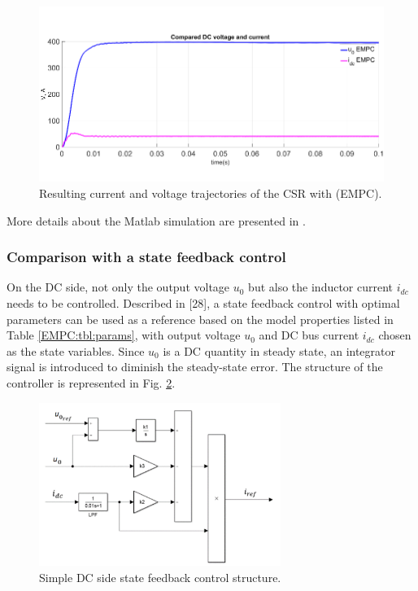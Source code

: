     \begin{figure}[!ht]
        \centering
        \includegraphics[width=\textwidth]{EMPC_PNG_Pics/Result_PerformanceEMPC.png}
        \caption{Resulting current and voltage trajectories of the CSR with (EMPC).}
        \label{EMPC:fig:Result_PerformanceEMPC}
    \end{figure}

    More details about the Matlab simulation are presented in \cite{neukirchner2019linkedmodel}.

    \subsubsection{Comparison with a state feedback control}\label{EMPC:sec:Comparison}

    On the DC side, not only the output voltage $u_0$ but also the inductor current $i_{dc}$ needs to be controlled. Described in [28], a state feedback control with optimal parameters can be used as a reference based on the model properties listed in Table \ref{EMPC:tbl:params}, with output voltage $u_0$ and DC bus current $i_{dc}$ chosen as the state variables. Since $u_0$ is a DC quantity in steady state, an integrator signal is introduced to diminish the steady-state error. The structure of the controller is represented in Fig. \ref{EMPC:fig:SFeedbackDC}.

    \begin{figure}[!ht]
        \centering
        \includegraphics[width=0.7\textwidth]{EMPC_PNG_Pics/SFeedbackDC.png}
        \caption{Simple DC side state feedback control structure.}
        \label{EMPC:fig:SFeedbackDC}
    \end{figure}

